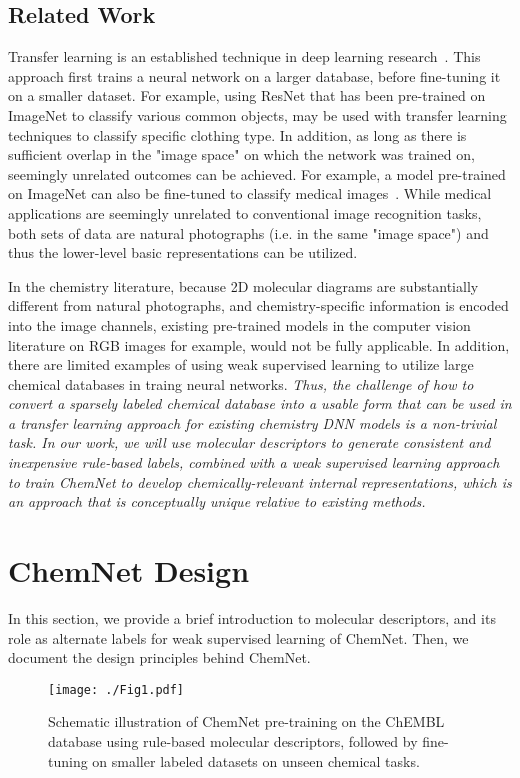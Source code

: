 \documentclass[sigconf]{acmart}
\begin{document}
\subsection{Related Work}
Transfer learning is an established technique in deep learning research~\cite{oquab2014}. This approach first trains a neural network on a larger database, before fine-tuning it on a smaller dataset. For example, using ResNet that has been pre-trained on ImageNet to classify various common objects, may be used with transfer learning techniques to classify specific clothing type. In addition, as long as there is sufficient overlap in the "image space" on which the network was trained on, seemingly unrelated outcomes can be achieved. For example, a model pre-trained on ImageNet can also be fine-tuned to classify medical images~\cite{shie2015}. While medical applications are seemingly unrelated to conventional image recognition tasks, both sets of data are natural photographs (i.e. in the same "image space") and thus the lower-level basic representations can be utilized.

In the chemistry literature, because 2D molecular diagrams are substantially different from natural photographs, and chemistry-specific information is encoded into the image channels, existing pre-trained models in the computer vision literature on RGB images for example, would not be fully applicable. In addition, there are limited examples of using weak supervised learning to utilize large chemical databases in traing neural networks. \textit{Thus, the challenge of how to convert a sparsely labeled chemical database into a usable form that can be used in a transfer learning approach for existing chemistry DNN models is a non-trivial task. In our work, we will use molecular descriptors to generate consistent and inexpensive rule-based labels, combined with a weak supervised learning approach to train ChemNet to develop chemically-relevant internal representations, which is an approach that is conceptually unique relative to existing methods.}

\section{ChemNet Design}
\label{sec:design}

In this section, we provide a brief introduction to molecular descriptors, and its role as alternate labels for weak supervised learning of ChemNet. Then, we document the design principles behind ChemNet.

\begin{figure*}[!htbp]
\centering
\texttt{[image: ./Fig1.pdf]}
\caption{\small Schematic illustration of ChemNet pre-training on the ChEMBL database using rule-based molecular descriptors, followed by fine-tuning on smaller labeled datasets on unseen chemical tasks.}
\label{fig:fig1}
\end{figure*}
\end{document}
